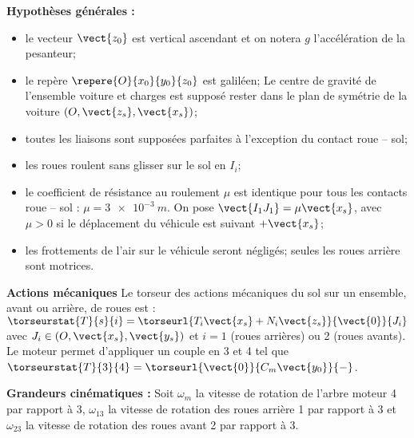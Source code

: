 
\textbf{Hypothèses générales : }
\begin{itemize}
\item le vecteur $\vect{z_0}$ est vertical ascendant et on notera $g$ l'accélération de la pesanteur;
\item le repère $\repere{O}{x_0}{y_0}{z_0}$ est galiléen;
Le centre de gravité de l’ensemble voiture et charges est supposé rester dans le
plan de symétrie de la voiture $\left(O,\vect{z_s},\vect{x_s}\right)$;
\item toutes les liaisons sont supposées parfaites à l’exception du contact roue -- sol;
\item les roues roulent sans glisser sur le sol en $I_i$;
\item le coefficient de résistance au roulement $\mu$ est identique pour tous les contacts
roue -- sol : $\mu = \SI{3e-3}{m}$. On pose $\vect{I_1J_1}=\mu \vect{x_s}$, avec $\mu >0$
si le déplacement du véhicule est suivant $+\vect{x_s}$;
\item les frottements de l’air sur le véhicule seront négligés;
seules les roues arrière sont motrices.
\end{itemize}

\textbf{Actions mécaniques}
Le torseur des actions mécaniques du sol sur un ensemble, avant ou arrière, de roues
est :
$\torseurstat{T}{s}{i}=\torseurl{T_i\vect{x_s}+N_i\vect{z_s}}{\vect{0}}{J_i}$ avec $J_i \in \left(O,\vect{x_s},\vect{y_s}\right)$ et $i=1$ (roues arrières) ou 2 (roues avants). Le moteur permet d'appliquer un couple en 3 et 4 tel que 
$\torseurstat{T}{3}{4}=\torseurl{\vect{0}}{C_m\vect{y_0}}{-}$. 



\textbf{Grandeurs cinématiques :}
Soit $\omega_m$ la vitesse de rotation de l’arbre moteur 4 par rapport à 3, $\omega_{13}$ la vitesse de rotation des roues arrière 1 par rapport à 3 et $\omega_{23}$ la vitesse de rotation des roues avant 2 par rapport à 3.


